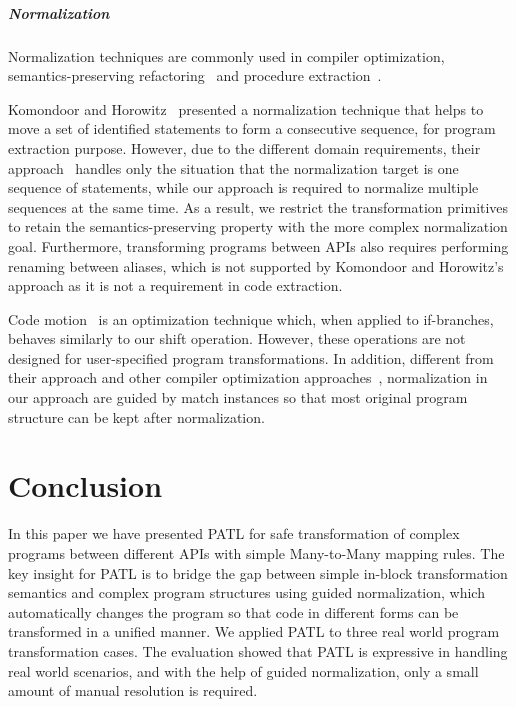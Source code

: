 \documentclass[letterpaper, USenglish]{lipics-v2016}
\newcommand{\PATL}{PATL\xspace}
\theoremstyle{plain}
\begin{document}
\subparagraph*{Normalization}
Normalization techniques are commonly used in compiler
optimization\cite{Knoop:1992:LCM:143095.143136,Aho:2006:CPT:1177220,DBLP:conf/sefm/KanadeSK06,Wegman:1991:CPC:103135.103136,Callahan:1986:ICP:12276.13327}, semantics-preserving
refactoring~\cite{Opdyke:1992:ROF:169783,Roberts:1999:PAR:929806} and procedure extraction~\cite{komondoor2000semantics}. 

Komondoor and Horowitz~\cite{komondoor2000semantics}
presented a normalization technique that helps to move a set of
identified statements to form a consecutive sequence, for program
extraction purpose. However, due to the different domain
requirements, their approach~\cite{komondoor2000semantics} handles
only the situation that the normalization target is one sequence of
statements, while our approach is required to normalize multiple
sequences at the same time. As a result, we restrict the
transformation primitives to retain the semantics-preserving
property with the more complex normalization goal. Furthermore,
transforming programs between APIs also requires performing renaming
between aliases, which is not supported by Komondoor and Horowitz's
approach \cite{komondoor2000semantics} as it is not a requirement in code extraction.

Code motion~\cite{Knoop:1992:LCM:143095.143136} is an optimization technique which, when applied to
if-branches, behaves similarly to our shift operation. However, these operations are not designed for user-specified program
transformations. In addition, different from their approach and other compiler optimization approaches~\cite{Aho:2006:CPT:1177220,DBLP:conf/sefm/KanadeSK06,Wegman:1991:CPC:103135.103136,Callahan:1986:ICP:12276.13327}, normalization in our approach are guided by match instances so that most original program structure can be kept after normalization.


\section{Conclusion}\label{sec:conclusion}
In this paper we have presented \PATL for safe transformation of complex programs between different APIs with simple Many-to-Many mapping rules. The key insight for \PATL is to bridge the gap between simple in-block transformation semantics and complex program structures using guided normalization, which automatically changes the program so that code in different forms can be transformed in a unified manner. We applied \PATL to three real world program transformation cases. The evaluation showed that \PATL is expressive in handling real world scenarios, and with the help of guided normalization, only a small amount of manual resolution is required.
\end{document}
